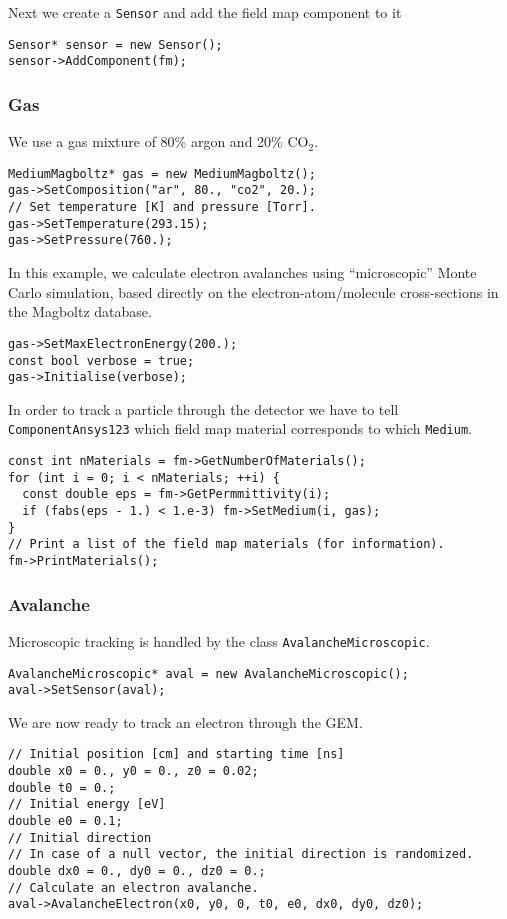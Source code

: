 Next we create a \texttt{Sensor} and add the field map 
component to it
\begin{lstlisting}
Sensor* sensor = new Sensor();
sensor->AddComponent(fm);
\end{lstlisting}

\subsubsection{Gas}

We use a gas mixture of 80\% argon and 20\% CO\(_{2}\).
\begin{lstlisting}
MediumMagboltz* gas = new MediumMagboltz();
gas->SetComposition("ar", 80., "co2", 20.);
// Set temperature [K] and pressure [Torr].
gas->SetTemperature(293.15);
gas->SetPressure(760.);
\end{lstlisting}

In this example, we calculate electron avalanches using 
``microscopic'' Monte Carlo simulation, based directly on the 
electron-atom/molecule cross-sections in the Magboltz database. 
 
\begin{lstlisting}
gas->SetMaxElectronEnergy(200.);
const bool verbose = true;
gas->Initialise(verbose);
\end{lstlisting}

In order to track a particle through the detector we have to 
tell \texttt{ComponentAnsys123} which field map material corresponds 
to which \texttt{Medium}.
\begin{lstlisting}
const int nMaterials = fm->GetNumberOfMaterials();
for (int i = 0; i < nMaterials; ++i) {
  const double eps = fm->GetPermmittivity(i);
  if (fabs(eps - 1.) < 1.e-3) fm->SetMedium(i, gas);
}
// Print a list of the field map materials (for information).
fm->PrintMaterials();
\end{lstlisting}

\subsubsection{Avalanche}

Microscopic tracking is handled by the class 
\texttt{AvalancheMicroscopic}.
\begin{lstlisting}
AvalancheMicroscopic* aval = new AvalancheMicroscopic();
aval->SetSensor(aval);
\end{lstlisting}
We are now ready to track an electron through the GEM.  
\begin{lstlisting}
// Initial position [cm] and starting time [ns]
double x0 = 0., y0 = 0., z0 = 0.02;
double t0 = 0.;
// Initial energy [eV]
double e0 = 0.1;
// Initial direction 
// In case of a null vector, the initial direction is randomized.
double dx0 = 0., dy0 = 0., dz0 = 0.;
// Calculate an electron avalanche.
aval->AvalancheElectron(x0, y0, 0, t0, e0, dx0, dy0, dz0);
\end{lstlisting}
